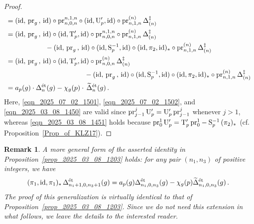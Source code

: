 \documentclass{amsart}
\numberwithin{equation}{section}
\newtheorem{remark}[theorem]{Remark}
\newcommand{\etale}{\textup{\'et}}
\begin{document}
\begin{proof}
\begin{align}
       \label{eqn_2025_03_08_1450} &=({\rm id},\,{\rm pr}_g\,,\,{\rm id})\circ {\rm pr}^{n,1,n}_{n,0,n} \circ({\rm id},\mathrm{U}_{p}',{\rm id}) \circ {\rm pr}^{(n)}_{n,1,n}  \,\Delta_{(n)}^{\ddagger}\\
       \label{eqn_2025_03_08_1451} &=({\rm id},\,{\rm pr}_g\,,\,{\rm id})\circ ({\rm id},\mathrm{T}_{p}',{\rm id})\circ  {\rm pr}^{n,1,n}_{n,0,n} \circ {\rm pr}^{(n)}_{n,1,n}  \,\Delta_{(n)}^{\ddagger}\\
       \notag& \hspace{2cm} -({\rm id},\,{\rm pr}_g\,,\,{\rm id})\circ ({\rm id},\mathrm{S}_p^{-1},{\rm id})\circ ({\rm id},\pi_2,{\rm id})_*\circ {\rm pr}^{(n)}_{n,1,n}  \,\Delta_{(n)}^{\ddagger}\\
       \notag & =  ({\rm id},\,{\rm pr}_g\,,\,{\rm id})\circ ({\rm id},\mathrm{T}_{p}',{\rm id})\circ {\rm pr}^{(n)}_{n,0,n}  \,\Delta_{(n)}^{\ddagger} \\
       \notag &\hspace{4cm}- ({\rm id},\,{\rm pr}_g\,,\,{\rm id})\circ ({\rm id},\mathrm{S}_p^{-1},{\rm id})\circ ({\rm id},\pi_2,{\rm id})_*\circ {\rm pr}^{(n)}_{n,1,n}  \,\Delta_{(n)}^{\ddagger}\\
      \notag & =  a_p(g)\cdot \Delta_{n}^{\etale}(g)- \chi_g(p)\cdot  \,\widetilde{\Delta}_{n}^{\etale}(g)\,.
    \end{align}
    Here, \eqref{eqn_2025_07_02_1501}, \eqref{eqn_2025_07_02_1502}, and \eqref{eqn_2025_03_08_1450} are valid since %
    ${\rm pr}^j_{j-1}\,\mathrm{U}_{p}'=\mathrm{U}_{p}'\,{\rm pr}^j_{j-1}$ whenever $j>1$, whereas \eqref{eqn_2025_03_08_1451} holds because ${\rm pr}^1_{0}\,\mathrm{U}_{p}'=\mathrm{T}_{p}'\,{\rm pr}^1_{0}-\mathrm{S}_p^{-1}\,(\pi_2)_*$ (cf. Proposition~\ref{Prop_of_KLZ17}).
\end{proof}

\begin{remark}
    A more general form of the asserted identity in Proposition~\ref{prop_2025_03_08_1203} holds: for any pair $(n_1,n_3)$ of positive integers, we have  
    \[
   (\pi_1, {\rm id},\pi_1)_*\,\Delta_{n_1+1,0,n_3+1}^{\etale}(g)=a_p(g) \Delta_{n_1,0,n_3} ^{\etale}(g)-\chi_g(p)\widetilde{\Delta}_{n_1,0,n_3}^{\etale}(g)\,.
    \]
    The proof of this generalization is virtually identical to that of Proposition~\ref{prop_2025_03_08_1203}. Since we do not need this extension in what follows, we leave the details to the interested reader.
\end{remark}
\end{document}

